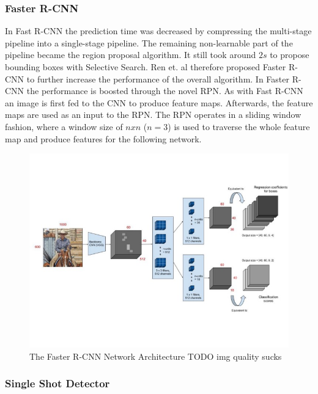 \subsubsection{Faster R-CNN}
In Fast \ac{R-CNN} the prediction time was decreased by compressing the multi-stage pipeline into a single-stage pipeline.
The remaining non-learnable part of the pipeline became the region proposal algorithm.
It still took around $2s$ to propose bounding boxes with Selective Search.
Ren et. al therefore proposed Faster \ac{R-CNN} \cite{faster_rcnn} to further increase the performance of the overall algorithm.
In Faster \ac{R-CNN} the performance is boosted through the novel \ac{RPN}.
As with Fast \ac{R-CNN} an image is first fed to the \ac{CNN} to produce feature maps.
Afterwards, the feature maps are used as an input to the \ac{RPN}.
The \ac{RPN} operates in a sliding window fashion, where a window size of $nxn$ ($n = 3$) is used to traverse the whole feature map and produce features for the following network.

\begin{figure}
\begin{center}
    \includegraphics[width=14cm]{imgs/faster_rcnn.jpg}
    \caption{The Faster R-CNN Network Architecture \cite{faster_rcnn_pic} TODO img quality sucks}
    \label{fig:faster_rcnn}
\end{center}
\end{figure}

\subsubsection{Single Shot Detector}

